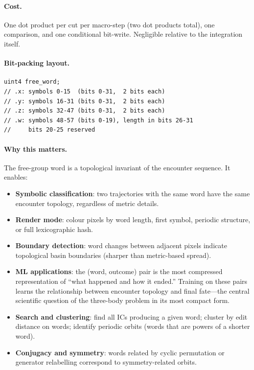 \documentclass[11pt]{report}
\begin{document}
\paragraph{Cost.} One dot product per cut per macro-step (two dot products total), one comparison, and one conditional bit-write. Negligible relative to the integration itself.

\paragraph{Bit-packing layout.}
\begin{verbatim}
uint4 free_word;
// .x: symbols 0-15  (bits 0-31,  2 bits each)
// .y: symbols 16-31 (bits 0-31,  2 bits each)
// .z: symbols 32-47 (bits 0-31,  2 bits each)
// .w: symbols 48-57 (bits 0-19), length in bits 26-31
//     bits 20-25 reserved
\end{verbatim}

\paragraph{Why this matters.} The free-group word is a topological invariant of the encounter sequence. It enables:
\begin{itemize}[nosep]
\item \textbf{Symbolic classification}: two trajectories with the same word have the same encounter topology, regardless of metric details.
\item \textbf{Render mode}: colour pixels by word length, first symbol, periodic structure, or full lexicographic hash.
\item \textbf{Boundary detection}: word changes between adjacent pixels indicate topological basin boundaries (sharper than metric-based spread).
\item \textbf{ML applications}: the (word, outcome) pair is the most compressed representation of ``what happened and how it ended.'' Training on these pairs learns the relationship between encounter topology and final fate---the central scientific question of the three-body problem in its most compact form.
\item \textbf{Search and clustering}: find all ICs producing a given word; cluster by edit distance on words; identify periodic orbits (words that are powers of a shorter word).
\item \textbf{Conjugacy and symmetry}: words related by cyclic permutation or generator relabelling correspond to symmetry-related orbits.
\end{itemize}
\end{document}

